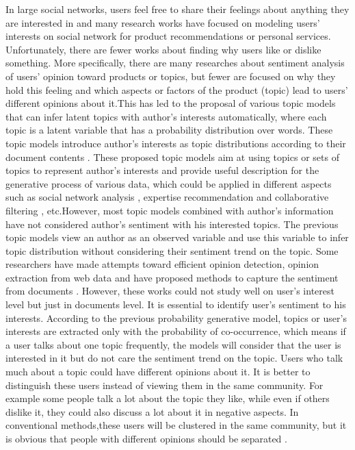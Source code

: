 \documentclass[runningheads,a4paper]{llncs}
\begin{document}
In large social networks, users feel free to share their feelings about anything they are interested in and many research works have focused on modeling users’ interests on social network for product
recommendations or personal services. Unfortunately,
there are fewer works about finding why users like or dislike something. More specifically,
there are many researches about
sentiment analysis of users’ opinion toward products or topics, but fewer are focused on why they hold this feeling and which aspects or factors of the product (topic) lead to users’ different opinions about it.This has led to the proposal of various topic models that can infer latent topics with author’s interests automatically, where each topic is a latent variable that has a probability distribution over words. These topic models introduce author’s
interests as topic distributions according to their
document contents \cite{blei2003latent,steyvers2004probabilistic,kawamae2010author,mimno2007expertise}. These proposed topic models aim at using topics or sets of topics to represent author’s interests and provide useful description for the generative process of various data, which could be applied in different aspects such as social network analysis \cite{liu2009topic,kawamae2010latent}, expertise recommendation \cite{mimno2007expertise} and collaborative filtering \cite{marlin2003modeling}, etc.However, most topic models combined with author’s information have not considered author’s sentiment with his interested topics. The previous topic models view an author as an observed variable and use this variable to infer topic distribution without considering their sentiment trend on the topic. Some researchers have made attempts toward efficient opinion detection, opinion extraction from web data and have proposed methods to capture the sentiment from documents \cite{mei2007topic,lin2009joint,jo2011aspect}. However, these works could not study well on user’s interest level but just in documents level. It is essential to identify user’s sentiment to his interests. According to the previous probability generative model, topics or user’s interests are extracted only with the probability of co-occurrence, which means if a user talks about one topic frequently, the models will consider that the user is interested in it but do not care the sentiment trend on the topic. Users who talk much about a topic could have different opinions about it. It is better to distinguish these users instead of viewing them in the same community. For example some people talk a lot about the topic they like, while even if others dislike it, they could also discuss a lot about it in negative aspects. In conventional methods,these users will be clustered in the same community, but it is obvious that people with different opinions should be separated \cite{zhao2012user}.
\end{document}
